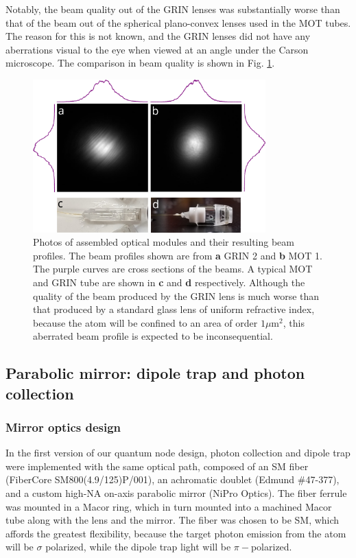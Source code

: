 Notably, the beam quality out of the GRIN lenses was substantially worse than that of the beam out of the spherical plano-convex lenses used in the MOT tubes. The reason for this is not known, and the GRIN lenses did not have any aberrations visual to the eye when viewed at an angle under the Carson microscope. The comparison in beam quality is shown in Fig. \ref{fig:assembled_optical_tubes}.

\begin{figure}[ht]
    \centering
    \includegraphics[width=0.8\textwidth]{Images/MOT_and_GRIN_tubes.pdf}
    \caption{Photos of assembled optical modules and their resulting beam profiles. The beam profiles shown are from \textbf{a} GRIN 2 and \textbf{b} MOT 1. The purple curves are cross sections of the beams. A typical MOT and GRIN tube are shown in \textbf{c} and \textbf{d} respectively. Although the quality of the beam produced by the GRIN lens is much worse than that produced by a standard glass lens of uniform refractive index, because the atom will be confined to an area of order $1 \mu$m$^2$, this aberrated beam profile is expected to be inconsequential.}
    \label{fig:assembled_optical_tubes}
\end{figure}

\subsection{Parabolic mirror: dipole trap and photon collection}\label{sec:mirror}

\subsubsection{Mirror optics design}

In the first version of our quantum node design, photon collection and dipole trap were implemented with the same optical path, composed of an SM fiber (FiberCore SM800(4.9/125)P/001), an achromatic doublet (Edmund $\#$47-377), and a custom high-NA on-axis parabolic mirror (NiPro Optics). The fiber ferrule was mounted in a Macor ring, which in turn mounted into a machined Macor tube along with the lens and the mirror. The fiber was chosen to be SM, which affords the greatest flexibility, because the target photon emission from the atom will be $\sigma$ polarized, while the dipole trap light will be $\pi-$polarized. 

